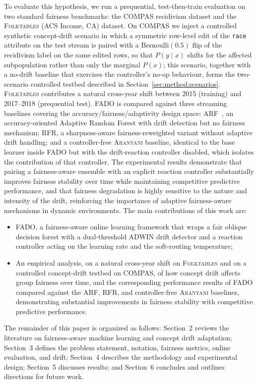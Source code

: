 \documentclass[sigconf,anonymous,review]{acmart}
\begin{document}
To evaluate this hypothesis, we run a prequential, test-then-train evaluation on two standard fairness benchmarks: the \textsc{COMPAS} recidivism dataset
and the \textsc{Folktables} (ACS Income, CA) dataset. On \textsc{COMPAS} we inject a controlled synthetic concept-drift scenario in which a symmetric row-level edit
of the \texttt{race} attribute on the test stream is paired with a $\mathrm{Bernoulli}(0.5)$ flip of the recidivism label on the same edited rows, so that
$P(y \mid x)$ shifts for the affected subpopulation rather than only the marginal $P(x)$; this scenario, together with a no-drift baseline that exercises the
controller's no-op behaviour, forms the two-scenario controlled testbed described in Section~\ref{sec:method:scenarios}. \textsc{Folktables} contributes a natural cross-year
shift between 2015 (training) and 2017--2018 (prequential test). \textsc{FADO} is compared against three streaming baselines covering the accuracy/fairness/adaptivity design
space: \textsc{ARF}~\cite{10.1007/s10994-017-5642-8}, an accuracy-oriented Adaptive Random Forest with drift detection but no fairness mechanism;
\textsc{RFR}, a sharpness-aware fairness-reweighted variant without adaptive drift handling;
and a controller-free \textsc{Aranyani} baseline, identical to the base learner inside \textsc{FADO} but with the drift-reaction controller disabled, which isolates the contribution of that controller. The experimental results demonstrate that pairing a fairness-aware ensemble with an explicit reaction controller substantially
improves fairness stability over time while maintaining competitive predictive performance, and that fairness degradation is highly sensitive to the nature and intensity of the
drift, reinforcing the importance of adaptive fairness-aware mechanisms in dynamic environments. The main contributions of this work are:
\begin{itemize}
\item \textsc{FADO}, a fairness-aware online learning framework that wraps a fair oblique decision forest with a dual-threshold ADWIN drift detector and a reaction controller acting on the learning rate and the soft-routing temperature;
\item An empirical analysis, on a natural cross-year shift on \textsc{Folktables} and on a controlled concept-drift testbed on \textsc{COMPAS}, of how concept drift affects group fairness over time,
and the corresponding performance results of \textsc{FADO} compared against the \textsc{ARF}, \textsc{RFR}, and controller-free \textsc{Aranyani} baselines, demonstrating substantial improvements in fairness stability with competitive predictive performance.
\end{itemize}
The remainder of this paper is organized as follows: Section~2 reviews the literature on fairness-aware machine learning and concept drift adaptation; Section~3 defines the 
problem statement, notation, fairness metrics, online evaluation, and drift; Section~4 describes the methodology and experimental design; Section~5 discusses results; and 
Section~6 concludes and outlines directions for future work.
\end{document}
